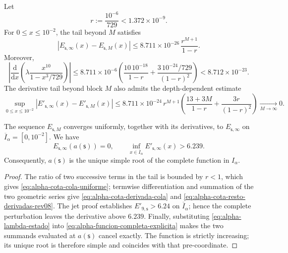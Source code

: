 Let
\[
 r:=\frac{10^{-6}}{729}<1.372\mathbin{\times}10^{-9}.
\]
For \(0\leq x\leq10^{-2}\), the tail beyond \(M\) satisfies
\begin{equation}
 \left|E_{\mathsf s,\infty}(x)-E_{\mathsf s,M}(x)\right|
 \leq
 8.711\mathbin{\times}10^{-26}\,\frac{r^{M+1}}{1-r}.
 \label{eq:alpha-cota-cola-uniforme}
\end{equation}
Moreover,
\begin{equation}
 \left|\frac{\mathrm d}{\mathrm dx}
  \left(\lambda\frac{x^{10}}{1-x^3/729}\right)\right|
 \leq 8.711\mathbin{\times}10^{-6}
 \left(\frac{10\,10^{-18}}{1-r}
 +\frac{3\,10^{-24}/729}{(1-r)^2}\right)
 <8.712\mathbin{\times}10^{-23}.
 \label{eq:alpha-cota-derivada-cola}
\end{equation}
The derivative tail beyond block \(M\) also admits the
depth-dependent estimate
\begin{equation}
 \sup_{0\le x\le10^{-2}}
 \left|E'_{\mathsf s,\infty}(x)-E'_{\mathsf s,M}(x)\right|
 \le 8.711\mathbin{\times}10^{-24}\,r^{M+1}
 \left(\frac{13+3M}{1-r}+\frac{3r}{(1-r)^2}\right)
 \xrightarrow[M\to\infty]{}0.
 \label{eq:alpha-cota-resto-derivadas-rev08}
\end{equation}

\begin{theorem}
\label{thm:alpha-raiz-completa-explicita}
The sequence \(E_{\mathsf s,M}\) converges uniformly, together with its
derivatives, to \(E_{\mathsf s,\infty}\) on
\(\overline I_\alpha=[0,10^{-2}]\). We have
\begin{equation}
 E_{\mathsf s,\infty}(a(\mathsf s))=0,
 \qquad
 \inf_{x\in\overline I_\alpha}
 E'_{\mathsf s,\infty}(x)>6.239.
 \label{eq:alpha-raiz-y-derivada-completas}
\end{equation}
Consequently, \(a(\mathsf s)\) is the unique simple root of the complete
function in \(I_\alpha\).
\end{theorem}

\begin{proof}
The ratio of two successive terms in the tail is bounded by \(r<1\),
which gives \eqref{eq:alpha-cota-cola-uniforme}; termwise differentiation
and summation of the two geometric series give
\eqref{eq:alpha-cota-derivada-cola} and
\eqref{eq:alpha-cota-resto-derivadas-rev08}. The jet proof establishes
\(E'_{9,\mathsf s}>6.24\) on \(\overline I_\alpha\); hence the complete
perturbation leaves the derivative above \(6.239\).
Finally, substituting \eqref{eq:alpha-lambda-estado} into
\eqref{eq:alpha-funcion-completa-explicita} makes the two summands evaluated at
\(a(\mathsf s)\) cancel exactly. The function is strictly increasing;
its unique root is therefore simple and coincides with that pre-coordinate.
\end{proof}

